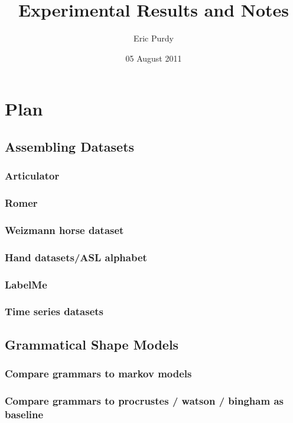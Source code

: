 \documentclass{book}
\begin{document}
\title{Experimental Results and Notes}
\author{Eric Purdy}
\date{05 August 2011}
\maketitle

\setcounter{tocdepth}{3}
\tableofcontents
\vspace*{1cm}

\chapter{Plan}
\label{sec-1}

\setcounter{section}{-1}
\section{Assembling Datasets}
\label{sec-1_1}
\subsection{Articulator}
\label{sec-1_1_1}
\subsection{Romer}
\label{sec-1_1_2}
\subsection{Weizmann horse dataset}
\label{sec-1_1_3}
\subsection{Hand datasets/ASL alphabet}
\label{sec-1_1_4}
\subsection{LabelMe}
\label{sec-1_1_5}
\subsection{Time series datasets}
\label{sec-1_1_6}
\section{Grammatical Shape Models}
\label{sec-1_2}
\subsection{Compare grammars to markov models}
\label{sec-1_2_1}
\subsection{Compare grammars to procrustes / watson / bingham as baseline}
\label{sec-1_2_2}
\end{document}
